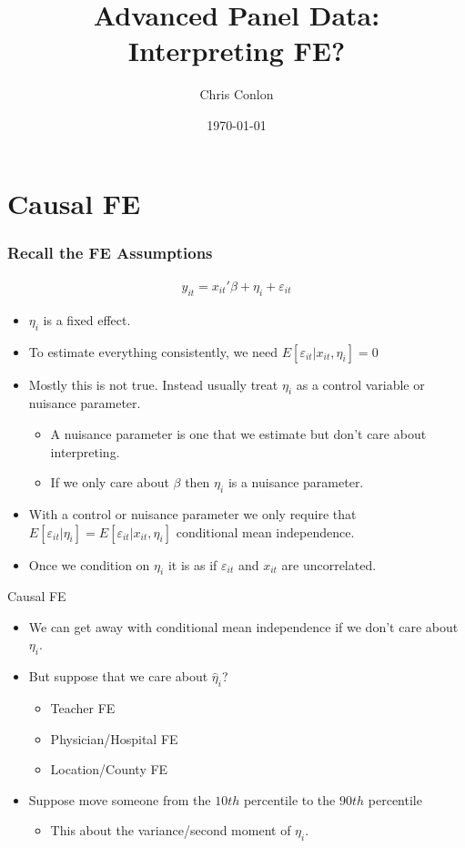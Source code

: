 \documentclass[xcolor=pdftex,dvipsnames,table,mathserif,aspectratio=169]{beamer}
\title{ Advanced Panel Data:\\
Interpreting FE?}
\author{Chris Conlon }
\institute{NYU Stern }
\date{\today}
\begin{document}
\maketitle

\section*{Causal FE}

\begin{frame}
\frametitle{Recall the FE Assumptions}
\begin{align*}
y_{it} =  x_{it}'\beta + \eta_i + \varepsilon_{it}
\end{align*}
\vspace{-.7cm}
\begin{itemize}
\item $\eta_i$ is a \alert{fixed effect}.
\item To estimate everything consistently, we need $E[ \varepsilon_{it} | x_{it}, \eta_i]=0$
\item Mostly this is not true. Instead usually treat $\eta_i$ as a \alert{control variable} or \alert{nuisance parameter}.
\begin{itemize}
\item A nuisance parameter is one that we estimate but don't care about interpreting.
\item If we only care about $\beta$ then $\eta_i$ is a nuisance parameter.
\end{itemize}
\item With a control or nuisance parameter we only require that $E[ \varepsilon_{it} | \eta_{i}]=E[ \varepsilon_{it} | x_{it}, \eta_i]$ \alert{conditional mean independence}.
\item Once we condition on $\eta_i$ it is as if $\varepsilon_{it}$ and $x_{it}$ are uncorrelated.
\end{itemize}
\end{frame}


\begin{frame}{Causal FE}
\begin{itemize}
\item We can get away with conditional mean independence if we don't care about $\eta_i$.
\item But suppose that we care about $\widehat{\eta}_i$?
\begin{itemize}
\item Teacher FE
\item Physician/Hospital FE
\item Location/County FE
\end{itemize}
\item Suppose move someone from the $10th$ percentile to the $90th$ percentile
\begin{itemize}
\item This about the variance/second moment of $\eta_i$.
\end{itemize}
\end{itemize}
\end{frame}
\end{document}
